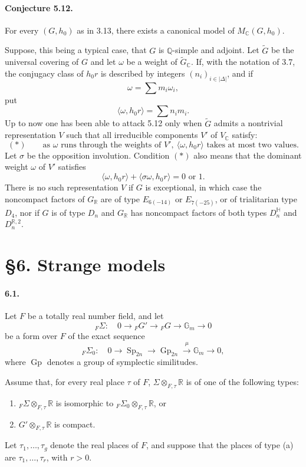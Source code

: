 \documentclass[10pt]{article}
\newcommand{\C}{\mathbb C}
\newcommand{\Gm}{\mathbb G_m}
\newcommand{\Q}{\mathbb Q}
\newcommand{\R}{\mathbb R}
\newcommand{\Gp}{\operatorname{Gp}}
\newcommand{\MC}{M_{\C}}
\newcommand{\Sp}{\operatorname{Sp}}
\begin{document}
\paragraph{Conjecture 5.12.} For every $(G,h_0)$ as in 3.13, there exists a canonical model of $\MC(G,h_0)$.

Suppose, this being a typical case, that $G$ is $\Q$-simple and adjoint. Let $\widetilde G$ be the universal covering of $G$ and let $\omega$ be a weight of $\widetilde G_{\C}$. If, with the notation of 3.7, the conjugacy class of $h_0r$ is described by integers $(n_i)_{i\in|\Delta|}$, and if
\[
\omega=\sum m_i\omega_i,
\]
put
\[
\langle\omega,h_0r\rangle=\sum n_i m_i.
\]
Up to now one has been able to attack 5.12 only when $\widetilde G$ admits a nontrivial representation $V$ such that all irreducible components $V'$ of $V_{\C}$ satisfy:
\[
(*)\qquad
\text{as }\omega\text{ runs through the weights of }V',\
\langle\omega,h_0r\rangle\text{ takes at most two values.}
\]
Let $\sigma$ be the opposition involution. Condition $(*)$ also means that the dominant weight $\omega$ of $V'$ satisfies
\[
\langle\omega,h_0r\rangle+\langle\sigma\omega,h_0r\rangle=0\text{ or }1.
\]
There is no such representation $V$ if $G$ is exceptional, in which case the noncompact factors of $G_{\R}$ are of type $E_{6(-14)}$ or $E_{7(-25)}$, or of trialitarian type $D_4$, nor if $G$ is of type $D_n$ and $G_{\R}$ has noncompact factors of both types $D_n^{\mathbb H}$ and $D_n^{\mathbb R,2}$.

\section*{\S 6. Strange models}

\paragraph{6.1.} Let $F$ be a totally real number field, and let
\[
\tag{6.1.1}
{}_F\Sigma:\quad 0\longrightarrow {}_FG'\longrightarrow {}_FG
 \longrightarrow \Gm\longrightarrow0
\]
be a form over $F$ of the exact sequence
\[
\tag{6.1.2}
{}_F\Sigma_0:\quad 0\longrightarrow\Sp_{2n}\longrightarrow\Gp_{2n}
 \xrightarrow{\ \mu\ }\Gm\longrightarrow0,
\]
where $\Gp$ denotes a group of symplectic similitudes.

Assume that, for every real place $\tau$ of $F$, $\Sigma\otimes_{F,\tau}\R$ is of one of the following types:
\begin{enumerate}[label=(\alph*)]
\item ${}_F\Sigma\otimes_{F,\tau}\R$ is isomorphic to ${}_F\Sigma_0\otimes_{F,\tau}\R$, or
\item $G'\otimes_{F,\tau}\R$ is compact.
\end{enumerate}
Let $\tau_1,\ldots,\tau_g$ denote the real places of $F$, and suppose that the places of type (a) are $\tau_1,\ldots,\tau_r$, with $r>0$.
\end{document}
